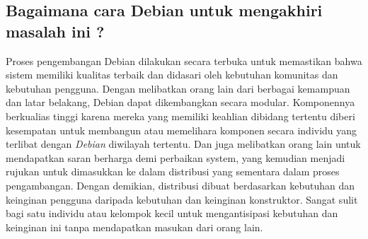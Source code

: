 \subsection{Bagaimana cara Debian untuk mengakhiri masalah ini ?}
Proses pengembangan Debian dilakukan secara terbuka untuk memastikan bahwa sistem memiliki kualitas terbaik dan didasari oleh kebutuhan komunitas dan kebutuhan pengguna. Dengan melibatkan orang lain dari berbagai kemampuan dan latar belakang, Debian dapat dikembangkan secara modular. Komponennya berkualias tinggi karena mereka yang memiliki keahlian dibidang tertentu diberi kesempatan untuk membangun atau memelihara komponen secara individu yang terlibat dengan \textit{Debian} diwilayah tertentu. Dan juga melibatkan orang lain untuk mendapatkan saran berharga demi perbaikan system, yang kemudian menjadi rujukan untuk dimasukkan ke dalam distribusi yang sementara dalam proses pengambangan. Dengan demikian, distribusi dibuat berdasarkan kebutuhan dan keinginan pengguna daripada kebutuhan dan keinginan konstruktor. Sangat sulit bagi satu individu atau kelompok kecil untuk mengantisipasi kebutuhan dan keinginan ini tanpa mendapatkan masukan dari orang lain.